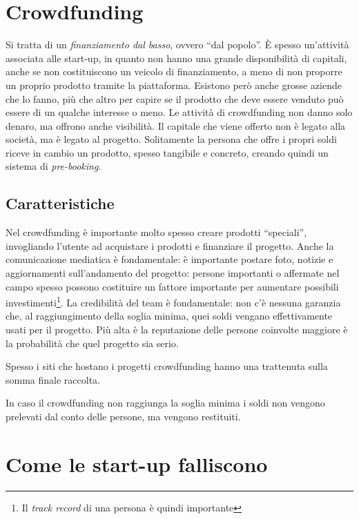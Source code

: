 \section{Crowdfunding}

Si tratta di un \textit{finanziamento dal basso}, ovvero ``dal popolo''. È
spesso un'attività associata alle start-up, in quanto non hanno una grande
disponibilità di capitali, anche se non costituiscono un veicolo di
finanziamento, a meno di non proporre un proprio prodotto tramite la
piattaforma. Esistono però anche grosse aziende che lo fanno, più che altro per
capire se il prodotto che deve essere venduto può essere di un qualche interesse
o meno. Le attività di crowdfunding non danno solo denaro, ma offrono anche
visibilità. Il capitale che viene offerto non è legato alla società, ma è legato
al progetto. Solitamente la persona che offre i propri soldi riceve in cambio un
prodotto, spesso tangibile e concreto, creando quindi un sistema di
\textit{pre-booking}.

\subsection{Caratteristiche}

Nel crowdfunding è importante molto spesso creare prodotti ``speciali'',
invogliando l'utente ad acquistare i prodotti e finanziare il progetto. Anche
la comunicazione mediatica è fondamentale: è importante postare foto, notizie e
aggiornamenti sull'andamento del progetto: persone importanti o affermate nel
campo spesso possono costituire un fattore importante per aumentare possibili
investimenti\footnote{Il \textit{track record} di una persona è quindi
importante}. La credibilità del team è fondamentale: non c'è nessuna garanzia
che, al raggiungimento della soglia minima, quei soldi vengano effettivamente
usati per il progetto. Più alta è la reputazione delle persone coinvolte
maggiore è la probabilità che quel progetto sia serio. 

Spesso i siti che hostano i progetti crowdfunding hanno una trattenuta sulla
somma finale raccolta.

In caso il crowdfunding non raggiunga la soglia minima i soldi non vengono
prelevati dal conto delle persone, ma vengono restituiti.

\section{Come le start-up falliscono}

